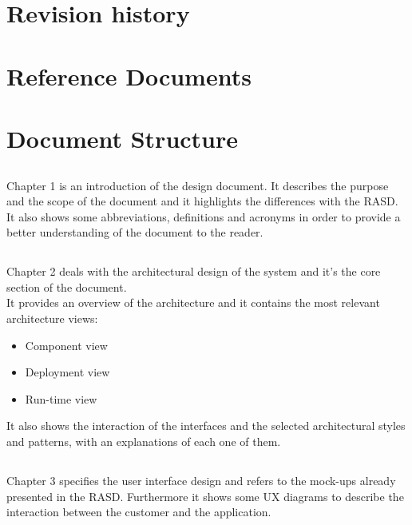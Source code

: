     \section{Revision history}
    \section{Reference Documents}
    \newpage
    \section{Document Structure}
        \subsection*{}
        Chapter 1 is an introduction of the design document. It describes the
        purpose and the scope of the document and it highlights the differences
        with the RASD. \\It also shows some abbreviations, definitions and
        acronyms in order to provide a better understanding of the document to
        the reader.

        \subsection*{}
        Chapter 2 deals with the architectural design of the system and it's the
        core section of the document. \\
        It provides an overview of the architecture and it contains the most
        relevant architecture views:
        \begin{itemize}
            \item Component view
            \item Deployment view
            \item Run-time view
        \end{itemize}
        It also shows the interaction of the interfaces and the selected
        architectural styles and patterns, with an explanations of each one of
        them.
                
        \subsection*{}
        Chapter 3 specifies the user interface design and refers to the mock-ups
        already presented in the RASD. Furthermore it shows some UX diagrams to
        describe the interaction between the customer and the application.

